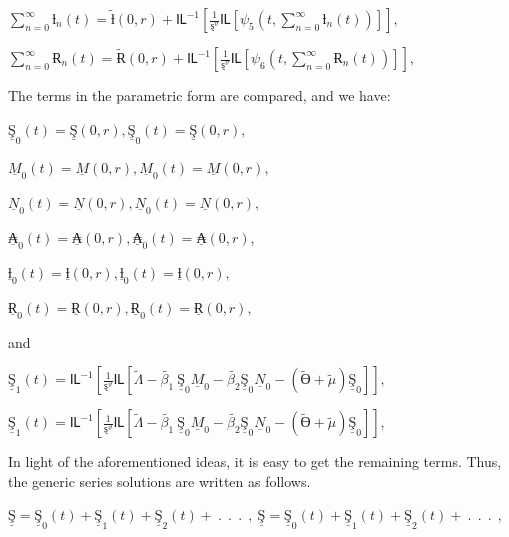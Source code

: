 \documentclass[10pt]{NSP1}
\begin{document}
\(\sum_{n = 0}^{\infty}{}ƚ_{n}(t) = \widetilde{ƚ}(0,r) + Ỻ^{- 1}\left\lbrack \frac{1}{ȿ^{\vartheta}}Ỻ\left\lbrack \psi_{5}\left( t,\sum_{n = 0}^{\infty}{}ƚ_{n}(t) \right) \right\rbrack \right\rbrack,\)

\(\sum_{n = 0}^{\infty}{}Ɍ_{n}(t) = \widetilde{Ɍ}(0,r) + Ỻ^{- 1}\left\lbrack \frac{1}{ȿ^{\vartheta}}Ỻ\left\lbrack \psi_{6}\left( t,\sum_{n = 0}^{\infty}{}Ɍ_{n}(t) \right) \right\rbrack \right\rbrack,\)

The terms in the parametric form are compared, and we have:

\({\underline{Ş}}_{0}(t) = \underline{Ş}(0,r),{\underline{Ş}}_{0}(t) = \underline{Ş}(0,r),\)

\({\underline{M}}_{0}(t) = \underline{M}(0,r),{\underline{M}}_{0}(t) = \underline{M}(0,r),\)

\({\underline{N}}_{0}(t) = \underline{N}(0,r),{\underline{N}}_{0}(t) = \underline{N}(0,r),\)

\({\underline{₳}}_{0}(t) = \underline{₳}(0,r),{\underline{₳}}_{0}(t) = \underline{₳}(0,r),\)

\({\underline{ƚ}}_{0}(t) = \underline{ƚ}(0,r),{\underline{ƚ}}_{0}(t) = \underline{ƚ}(0,r),\)

\({\underline{Ɍ}}_{0}(t) = \underline{Ɍ}(0,r),{\underline{Ɍ}}_{0}(t) = \underline{Ɍ}(0,r),\)

and

\({\underline{Ş}}_{1}(t) = Ỻ^{- 1}\left\lbrack \frac{1}{ȿ^{\vartheta}}Ỻ\left\lbrack \widetilde{\Lambda} - \widetilde{\beta_{1}}\ {\underline{Ş}}_{0}{\underline{M}}_{0} - \widetilde{\beta_{2}}{\underline{Ş}}_{0}{\underline{N}}_{0} - \left( \widetilde{Ө} + \widetilde{\mu} \right){\underline{Ş}}_{0} \right\rbrack \right\rbrack,\)

\({\underline{Ş}}_{1}(t) = Ỻ^{- 1}\left\lbrack \frac{1}{ȿ^{\vartheta}}Ỻ\left\lbrack \widetilde{\Lambda} - \widetilde{\beta_{1}}\ {\underline{Ş}}_{0}{\underline{M}}_{0} - \widetilde{\beta_{2}}{\underline{Ş}}_{0}{\underline{N}}_{0} - \left( \widetilde{Ө} + \widetilde{\mu} \right){\underline{Ş}}_{0} \right\rbrack \right\rbrack\),

In light of the aforementioned ideas, it is easy to get the remaining terms. Thus, the generic series solutions are written as follows.

\(\underline{Ş} = {\underline{Ş}}_{0}(t) + {\underline{Ş}}_{1}(t) + {\underline{Ş}}_{2}(t) + \ .\ \ .\ \ .\ \ ,\ \underline{Ş} = {\underline{Ş}}_{0}(t) + {\underline{Ş}}_{1}(t) + {\underline{Ş}}_{2}(t) + \ .\ \ .\ \ .\ \ ,\)
\end{document}
